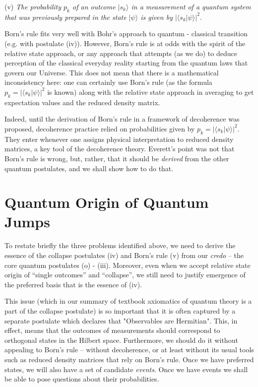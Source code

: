 \documentclass[aps,amsmath,amssymb,amsfonts,12pt]{revtex4-1}
\newcommand{\ket}[1]    {| #1 \rangle}
\newcommand{\bk}[2]     {\langle #1 | #2 \rangle}
\newcommand{\+}         {\dagger}
\begin{document}
(v) {\it The probability $p_k$ of an outcome $\ket {s_k}$ in a measurement of a quantum system that was
previously prepared in the state $\ket \psi$ is given by $|\bk {s_k} \psi |^2$}.

Born's rule fits very well with Bohr's approach to quantum - classical transition (e.g.
with postulate (iv)). However, Born's rule is at odds with the spirit of the relative state
approach, or any approach that attempts (as we do) to deduce perception of the classical everyday reality starting from the quantum laws that govern our Universe. This does not mean that there is a mathematical inconsistency here: one can certainly
use Born's rule (as the formula $p_k= |\bk {s_k} \psi |^2$ is known) along with the relative state
approach in averaging to get expectation values and the reduced density matrix. 

Indeed, until the derivation of Born's rule in a framework of decoherence was proposed, 
decoherence practice relied on probabilities given by $p_k= |\bk {s_k} \psi |^2$. They enter whenever one assigns physical interpretation to reduced density matrices, a key tool of the decoherence theory. Everett's point was not that Born's rule is wrong, but,
rather, that it should be {\it derived} from the other quantum postulates, and we shall show how to do that. 

\section{Quantum Origin of Quantum Jumps}

To restate briefly the three problems identified above, we
need to derive the essence of the collapse postulates (iv)
and Born's rule (v) from our {\it credo} -- the core quantum postulates (o) - (iii).  Moreover, even when we accept relative
state origin of ``single outcomes'' and ``collapse'', we still need to justify emergence of the preferred basis that is
the essence of (iv). 

This issue (which in our summary of textbook axiomatics of quantum theory is a part of the collapse postulate) is so important that it is often captured by a separate postulate which declares that "Observables are Hermitian". This, in effect, means that the outcomes of measurements should correspond to orthogonal states in the Hilbert space. Furthermore, we should do it without appealing to Born's rule
-- without decoherence, or at least without its usual tools such as reduced density matrices that rely on Born's rule. Once we have preferred states, we will also have a set
of candidate {\it events}.  Once we have events we shall be able to pose questions about their probabilities.
\end{document}
